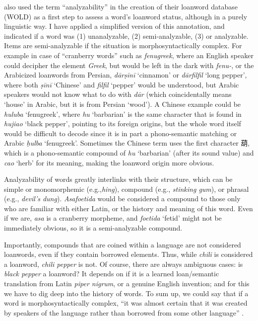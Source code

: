 \textcite[12]{haspelmath_loanwords_2009} also used the term ``analyzability'' in the creation of their loanword database (\gls{WOLD}) as a first step to assess a word's loanword status, although in a purely linguistic way. I have applied a simplified version of this annotation, and indicated if a word was (1) unanalyzable, (2) semi-analyzable, (3) or analyzable. Items are semi-analyzable if the situation is morphosyntactically complex. For example in case of ``cranberry words'' such as \textit{fenugreek}, where an English speaker could decipher the element \textit{Greek}, but would be left in the dark with \textit{fenu-}, or the Arabicized loanwords from Persian, \textit{dārṣīnī} `cinnamon' or \textit{dārfilfil} `long pepper', where both \textit{ṣīnī} `Chinese' and \textit{filfil} `pepper' would be understood, but Arabic speakers would not know what to do with \textit{dār} (which coincidentally means `house' in Arabic, but it is from Persian `wood'). A Chinese example could be \textit{huluba} `fenugreek', where \textit{hu} `barbarian' is the same character that is found in \textit{hujiao} `black pepper', pointing to its foreign origins, but the whole word itself would be difficult to decode since it is in part a phono-semantic matching or Arabic \textit{ḥulba} `fenugreek'. Sometimes the Chinese term uses the first character 葫, which is a phono-semantic compound of \textit{hu} `barbarian' (after its sound value) and \textit{cao} `herb' for its meaning, making the loanword origin more obvious. 

Analyzability of words greatly interlinks with their structure, which can be simple or monomorphemic (e.g.,\textit{hing}), compound (e.g., \textit{stinking gum}), or phrasal (e.g., \textit{devil's dung}). \textit{Asafoetida} would be considered a compound to those only who are familiar with either Latin, or the history and meaning of this word. Even if we are, \textit{asa} is a cranberry morpheme, and \textit{foetida} `fetid' might not be immediately obvious, so it is a semi-analyzable compound. 

Importantly, compounds that are coined within a language are not considered loanwords, even if they contain borrowed elements. Thus, while \textit{chili} is considered a loanword, \textit{chili pepper} is not. Of course, there are always ambiguous cases: is \textit{black pepper} a loanword? It depends on if it is a learned loan/semantic translation from Latin \textit{piper nigrum}, or a genuine English invention; and for this we have to dig deep into the history of words. To sum up, we could say that if a word is morphosyntactically complex, ``it was almost certain that it was created by speakers of the language rather than borrowed from some other language'' \autocite[12]{haspelmath_loanwords_2009}. 

